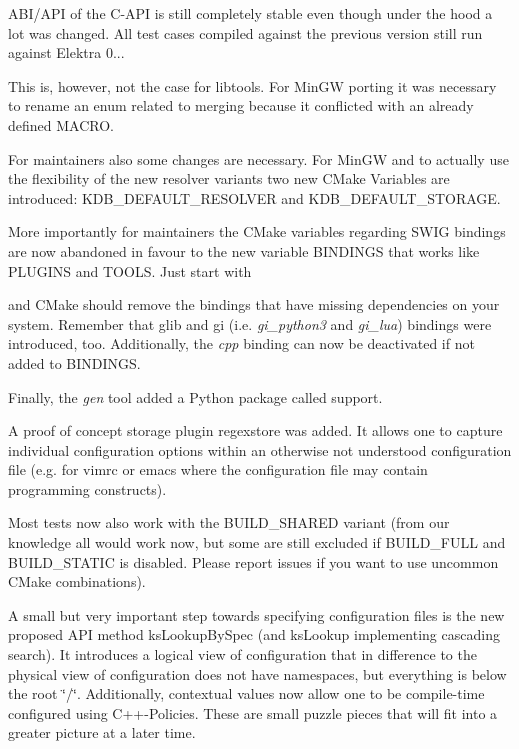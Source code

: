 A\+B\+I/\+A\+PI of the C-\/\+A\+PI is still completely stable even though under the hood a lot was changed. All test cases compiled against the previous version still run against Elektra 0...

This is, however, not the case for libtools. For Min\+GW porting it was necessary to rename an enum related to merging because it conflicted with an already defined M\+A\+C\+RO.

For maintainers also some changes are necessary. For Min\+GW and to actually use the flexibility of the new resolver variants two new C\+Make Variables are introduced\+: K\+D\+B\+\_\+\+D\+E\+F\+A\+U\+L\+T\+\_\+\+R\+E\+S\+O\+L\+V\+ER and K\+D\+B\+\_\+\+D\+E\+F\+A\+U\+L\+T\+\_\+\+S\+T\+O\+R\+A\+GE.

More importantly for maintainers the C\+Make variables regarding S\+W\+IG bindings are now abandoned in favour to the new variable B\+I\+N\+D\+I\+N\+GS that works like P\+L\+U\+G\+I\+NS and T\+O\+O\+LS. Just start with


\begin{DoxyCode}{0}
\end{DoxyCode}


and C\+Make should remove the bindings that have missing dependencies on your system. Remember that glib and gi (i.\+e. {\itshape gi\+\_\+python3} and {\itshape gi\+\_\+lua}) bindings were introduced, too. Additionally, the {\itshape cpp} binding can now be deactivated if not added to B\+I\+N\+D\+I\+N\+GS.

Finally, the {\itshape gen} tool added a Python package called {\ttfamily support}.

A proof of concept storage plugin {\ttfamily regexstore} was added. It allows one to capture individual configuration options within an otherwise not understood configuration file (e.\+g. for vimrc or emacs where the configuration file may contain programming constructs).

Most tests now also work with the B\+U\+I\+L\+D\+\_\+\+S\+H\+A\+R\+ED variant (from our knowledge all would work now, but some are still excluded if B\+U\+I\+L\+D\+\_\+\+F\+U\+LL and B\+U\+I\+L\+D\+\_\+\+S\+T\+A\+T\+IC is disabled. Please report issues if you want to use uncommon C\+Make combinations).

A small but very important step towards specifying configuration files is the new proposed A\+PI method ks\+Lookup\+By\+Spec (and ks\+Lookup implementing cascading search). It introduces a {\ttfamily logical view} of configuration that in difference to the {\ttfamily physical view} of configuration does not have namespaces, but everything is below the root \char`\"{}/\char`\"{}. Additionally, contextual values now allow one to be compile-\/time configured using C++-\/\+Policies. These are small puzzle pieces that will fit into a greater picture at a later time.

